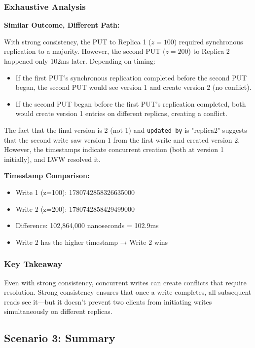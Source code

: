 \documentclass[10pt,a4paper]{article}
\begin{document}
\subsubsection{Exhaustive Analysis}

\textbf{Similar Outcome, Different Path:}

With strong consistency, the PUT to Replica 1 ($z=100$) required synchronous replication to a majority. However, the second PUT ($z=200$) to Replica 2 happened only 102ms later. Depending on timing:
\begin{itemize}
    \item If the first PUT's synchronous replication completed before the second PUT began, the second PUT would see version 1 and create version 2 (no conflict).
    \item If the second PUT began before the first PUT's replication completed, both would create version 1 entries on different replicas, creating a conflict.
\end{itemize}

The fact that the final version is 2 (not 1) and \texttt{updated\_by} is "replica2" suggests that the second write saw version 1 from the first write and created version 2. However, the timestamps indicate concurrent creation (both at version 1 initially), and LWW resolved it.

\textbf{Timestamp Comparison:}
\begin{itemize}
    \item Write 1 (z=100): 1780742858326635000
    \item Write 2 (z=200): 1780742858429499000
    \item Difference: 102,864,000 nanoseconds = 102.9ms
    \item Write 2 has the higher timestamp → Write 2 wins
\end{itemize}

\subsubsection{Key Takeaway}

Even with strong consistency, concurrent writes can create conflicts that require resolution. Strong consistency ensures that once a write completes, all subsequent reads see it---but it doesn't prevent two clients from initiating writes simultaneously on different replicas.

\subsection{Scenario 3: Summary}
\end{document}

